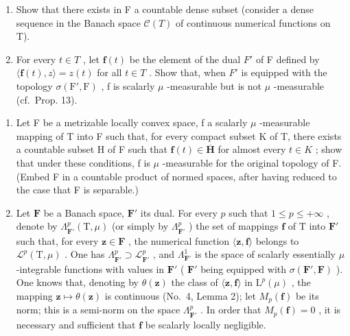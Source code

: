 \begin{enumerate}
\def\labelenumi{\alph{enumi})}
\item
  Show that there exists in F a countable dense subset (consider a dense sequence in the Banach space \(\mathcal{C}(T)\) of continuous numerical functions on T).
\item
  For every \(t \in T\) , let \(\mathbf{f}(t)\) be the element of the dual \(F'\) of F defined by \(\langle\mathbf{f}(t), z\rangle = z(t)\) for all \(t \in T\) . Show that, when \(F'\) is equipped with the topology \(\sigma(\mathrm{F}', \mathrm{F})\) , f is scalarly \(\mu\) -measurable but is not \(\mu\) -measurable (cf.~Prop. 13).
\end{enumerate}

\begin{enumerate}
\def\labelenumi{\arabic{enumi})}
\setcounter{enumi}{14}
\item
  Let F be a metrizable locally convex space, f a scalarly \(\mu\) -measurable mapping of T into F such that, for every compact subset K of T, there exists a countable subset H of F such that \(\mathbf{f}(t) \in \overline{\mathbf{H}}\) for almost every \(t \in K\) ; show that under these conditions, f is \(\mu\) -measurable for the original topology of F. (Embed F in a countable product of normed spaces, after having reduced to the case that F is separable.)
\item
  Let \(\mathbf{F}\) be a Banach space, \(\mathbf{F}'\) its dual. For every \(p\) such that \(1 \leqslant p \leqslant +\infty\) , denote by \(\Lambda_{\mathbf{F}'}^p(\mathrm{T},\mu)\) (or simply by \(\Lambda_{\mathbf{F}'}^p\) ) the set of mappings \(\mathbf{f}\) of \(\mathrm{T}\) into \(\mathbf{F}'\) such that, for every \(\mathbf{z} \in \mathbf{F}\) , the numerical function \(\langle \mathbf{z},\mathbf{f}\rangle\) belongs to \(\mathcal{L}^p(\mathrm{T},\mu)\) . One has \(\Lambda_{\mathbf{F}'}^p \supset \mathcal{L}_{\mathbf{F}'}^p\) , and \(\Lambda_{\mathbf{F}'}^1\) is the space of scalarly essentially \(\mu\) -integrable functions with values in \(\mathbf{F}'\) ( \(\mathbf{F}'\) being equipped with \(\sigma(\mathbf{F}',\mathbf{F})\) ). One knows that, denoting by \(\theta(\mathbf{z})\) the class of \(\langle \mathbf{z},\mathbf{f}\rangle\) in \(\mathrm{L}^p(\mu)\) , the mapping \(\mathbf{z} \mapsto \theta(\mathbf{z})\) is continuous (No.~4, Lemma 2); let \(M_p(\mathbf{f})\) be its norm; this is a semi-norm on the space \(\Lambda_{\mathbf{F}'}^p\) . In order that \(M_p(\mathbf{f}) = 0\) , it is necessary and sufficient that \(\mathbf{f}\) be scalarly locally negligible.
\end{enumerate}

